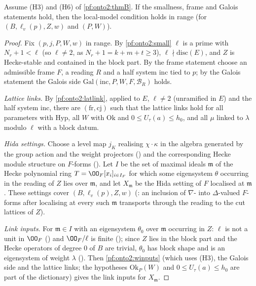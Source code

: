 \begin{proposition}\label{pf:onto2:model}
Assume (H3) and (H6) of \cref{pf:onto2:thmB}. If the smallness, frame and Galois statements hold, then the local-model condition holds
in range (for $(B,\ell_v(p),Z,w)$ and $(P,W)$).
\end{proposition}

\begin{proof}
Fix $(p,j,P,W,w)$ in range. By \cref{pf:onto2:small} $\ell$ is a prime with $N_r+1<\ell$ (so $\ell\ne2$, as $N_r+1=k+m+t\ge3$),
$\ell\nmid\mathrm{disc}(E)$, and $Z$ is Hecke-stable and contained in the block part. By the frame statement choose an admissible frame $F$,
a reading $R$ and a half system $\mathrm{inc}$ tied to $p$; by the Galois statement the Galois side $\mathrm{Gal}(\mathrm{inc},P,W,F,\mathcal
B_R)$ holds.

\emph{Lattice links.} By \cref{pf:onto2:latlink}, applied to $E$, $\ell\ne2$ (unramified in $E$) and the half system
$\mathrm{inc}$, there are $(\mathrm{fr},\mathrm{cj})$ such that the lattice links hold for all parameters with $\mathrm{Hyp}$, all
$W$ with $\mathrm{Ok}$ and $0\le U_\tau(a)\le h_0$, and all $\mu$ linked to $\lambda$ modulo $\ell$ with a block datum.

\emph{Hida settings.} Choose a level map $j_K$ realising $\chi\cdot\kappa$ in the algebra generated by the group action and the weight
projectors () and the corresponding Hecke module structure on $F$-forms
(). Let $I$ be the set of maximal ideals $\mathfrak m$ of the Hecke polynomial
ring $T=\OO_F[x_i]_{i\in I_F}$ for which some eigensystem $\theta$ occurring in the reading of $Z$ lies over $\mathfrak m$, and let
$X_{\mathfrak m}$ be the Hida setting of $F$ localised at $\mathfrak m$. These settings cover $(B,\ell_v(p),Z,w)$
(: an inclusion of $\nabla$- into $\Delta$-valued $F$-forms after localising at
every such $\mathfrak m$ transports through the reading to the cut lattices of $Z$).

\emph{Link inputs.} For $\mathfrak m\in I$ with an eigensystem $\theta_0$ over $\mathfrak m$ occurring in $Z$: $\ell$ is not a unit in
$\OO_F$ () and $\OO_F/\ell$ is finite
(); since $Z$ lies in the block part and the Hecke operators of degree $0$ of
$B$ are trivial, $\theta_0$ has block shape and is an eigensystem of weight $\lambda$
(). Then \cref{pf:onto2:winputs} (which uses (H3), the Galois side and the lattice links; the
hypotheses $\mathrm{Ok}_P(W)$ and $0\le U_\tau(a)\le h_0$ are part of the dictionary) gives the link inputs for $X_{\mathfrak m}$.
\end{proof}

